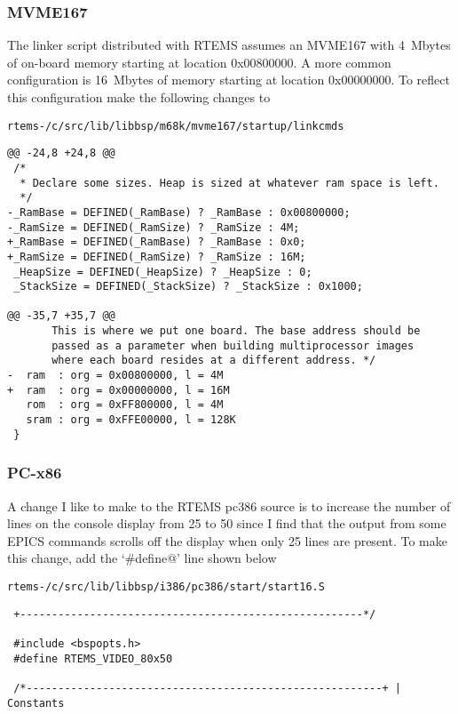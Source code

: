 \documentclass{report}
\begin{document}
\subsubsection {MVME167}
The linker script distributed with RTEMS assumes an MVME167 with 4~Mbytes of
on-board memory starting at location 0x00800000.  A more common configuration
is 16~Mbytes of memory starting at location 0x00000000.  To reflect this
configuration make the following changes to
\begin{alltt}
rtems-\rtemsVersion/c/src/lib/libbsp/m68k/mvme167/startup/linkcmds
\end{alltt}
\begin{verbatim}
@@ -24,8 +24,8 @@
 /*
  * Declare some sizes. Heap is sized at whatever ram space is left.
  */
-_RamBase = DEFINED(_RamBase) ? _RamBase : 0x00800000;
-_RamSize = DEFINED(_RamSize) ? _RamSize : 4M;
+_RamBase = DEFINED(_RamBase) ? _RamBase : 0x0;
+_RamSize = DEFINED(_RamSize) ? _RamSize : 16M;
 _HeapSize = DEFINED(_HeapSize) ? _HeapSize : 0;
 _StackSize = DEFINED(_StackSize) ? _StackSize : 0x1000;
 
@@ -35,7 +35,7 @@
       This is where we put one board. The base address should be
       passed as a parameter when building multiprocessor images
       where each board resides at a different address. */
-  ram  : org = 0x00800000, l = 4M
+  ram  : org = 0x00000000, l = 16M
   rom  : org = 0xFF800000, l = 4M
   sram : org = 0xFFE00000, l = 128K
 }
\end{verbatim}

\subsubsection {PC-x86}
A change I like to make to the RTEMS pc386 source is
to increase the number of lines on the console display from 25 to 50 since
I find that the output from some EPICS commands  scrolls off the display
when only 25 lines are present.
To make this change, add the `\verb@#define@' line shown below
\begin{alltt}
rtems-\rtemsVersion/c/src/lib/libbsp/i386/pc386/start/start16.S
\end{alltt}
\begin{verbatim}
 +------------------------------------------------------*/
 
 #include <bspopts.h>
 #define RTEMS_VIDEO_80x50
 
 /*--------------------------------------------------------+ | Constants
\end{verbatim}
\end{document}
